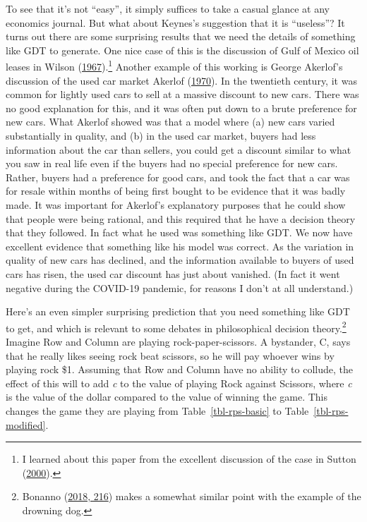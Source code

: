 \documentclass[
  12pt,
  letterpaper,
  DIV=11,
  numbers=noendperiod]{scrreprt}
\begin{document}
To see that it's not ``easy'', it simply suffices to take a casual
glance at any economics journal. But what about Keynes's suggestion that
it is ``useless''? It turns out there are some surprising results that
we need the details of something like GDT to generate. One nice case of
this is the discussion of Gulf of Mexico oil leases in Wilson
(\protect\hyperlink{ref-Wilson1967}{1967}).\footnote{I learned about
  this paper from the excellent discussion of the case in Sutton
  (\protect\hyperlink{ref-Sutton2000}{2000}).} Another example of this
working is George Akerlof's discussion of the used car market Akerlof
(\protect\hyperlink{ref-Akerlof1970}{1970}). In the twentieth century,
it was common for lightly used cars to sell at a massive discount to new
cars. There was no good explanation for this, and it was often put down
to a brute preference for new cars. What Akerlof showed was that a model
where (a) new cars varied substantially in quality, and (b) in the used
car market, buyers had less information about the car than sellers, you
could get a discount similar to what you saw in real life even if the
buyers had no special preference for new cars. Rather, buyers had a
preference for good cars, and took the fact that a car was for resale
within months of being first bought to be evidence that it was badly
made. It was important for Akerlof's explanatory purposes that he could
show that people were being rational, and this required that he have a
decision theory that they followed. In fact what he used was something
like GDT. We now have excellent evidence that something like his model
was correct. As the variation in quality of new cars has declined, and
the information available to buyers of used cars has risen, the used car
discount has just about vanished. (In fact it went negative during the
COVID-19 pandemic, for reasons I don't at all understand.)

Here's an even simpler surprising prediction that you need something
like GDT to get, and which is relevant to some debates in philosophical
decision theory.\footnote{Bonanno
  (\protect\hyperlink{ref-Bonanno2018}{2018, 216}) makes a somewhat
  similar point with the example of the drowning dog.} Imagine Row and
Column are playing rock-paper-scissors. A bystander, C, says that he
really likes seeing rock beat scissors, so he will pay whoever wins by
playing rock \$1. Assuming that Row and Column have no ability to
collude, the effect of this will to add \emph{c} to the value of playing
Rock against Scissors, where \emph{c} is the value of the dollar
compared to the value of winning the game. This changes the game they
are playing from Table~\ref{tbl-rps-basic} to
Table~\ref{tbl-rps-modified}.
\end{document}
